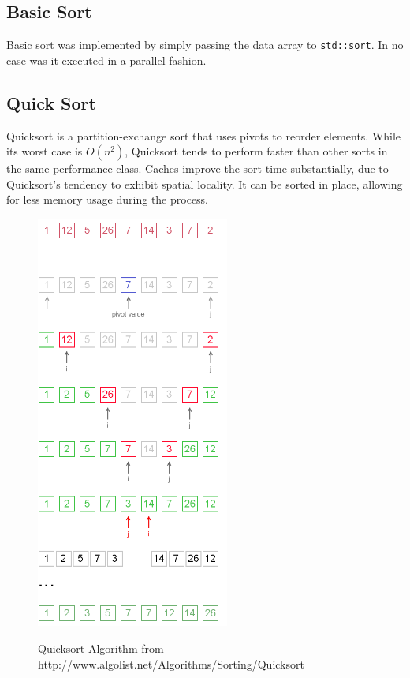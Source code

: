 \documentclass[journal]{IEEEtran}
\begin{document}
\subsection{Basic Sort}
Basic sort was implemented by simply passing the data array to \texttt{std::sort}. In no case was it executed in a parallel fashion.

\subsection{Quick Sort}

Quicksort is a partition-exchange sort that uses pivots to reorder elements. While its worst case is $O(n^2)$, Quicksort tends to perform faster than other sorts in the same performance class. Caches improve the sort time substantially, due to Quicksort's tendency to exhibit spatial locality. It can be sorted in place, allowing for less memory usage during the process. 

\begin{figure}[f]
  \caption{Quicksort Algorithm from http://www.algolist.net/Algorithms/Sorting/Quicksort}
  \centering
  \includegraphics[width=2.5in]{quick-sort.png}
  \label{fig:Quicksort Algorithm}
\end{figure}
\end{document}
